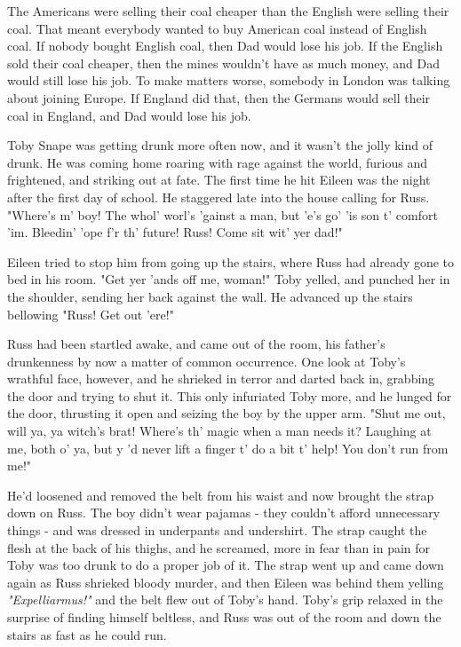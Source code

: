 \documentclass[a4paper,11pt]{article}
\begin{document}
The Americans were selling their coal cheaper than the English were selling their coal. That meant everybody wanted to buy American coal instead of English coal. If nobody bought English coal, then Dad would lose his job. If the English sold their coal cheaper, then the mines wouldn't have as much money, and Dad would still lose his job. To make matters worse, somebody in London was talking about joining Europe. If England did that, then the Germans would sell their coal in England, and Dad would lose his job.

Toby Snape was getting drunk more often now, and it wasn't the jolly kind of drunk. He was coming home roaring with rage against the world, furious and frightened, and striking out at fate. The first time he hit Eileen was the night after the first day of school. He staggered late into the house calling for Russ. "Where's m' boy! The whol' worl's 'gainst a man, but 'e's go' 'is son t' comfort 'im. Bleedin' 'ope f'r th' future! Russ! Come sit wit' yer dad!"

Eileen tried to stop him from going up the stairs, where Russ had already gone to bed in his room. "Get yer 'ands off me, woman!" Toby yelled, and punched her in the shoulder, sending her back against the wall. He advanced up the stairs bellowing "Russ! Get out 'ere!"

Russ had been startled awake, and came out of the room, his father's drunkenness by now a matter of common occurrence. One look at Toby's wrathful face, however, and he shrieked in terror and darted back in, grabbing the door and trying to shut it. This only infuriated Toby more, and he lunged for the door, thrusting it open and seizing the boy by the upper arm. "Shut me out, will ya, ya witch's brat! Where's th' magic when a man needs it? Laughing at me, both o' ya, but y 'd never lift a finger t' do a bit t' help! You don't run from me!"

He'd loosened and removed the belt from his waist and now brought the strap down on Russ. The boy didn't wear pajamas - they couldn't afford unnecessary things - and was dressed in underpants and undershirt. The strap caught the flesh at the back of his thighs, and he screamed, more in fear than in pain for Toby was too drunk to do a proper job of it. The strap went up and came down again as Russ shrieked bloody murder, and then Eileen was behind them yelling \emph{"Expelliarmus!"} and the belt flew out of Toby's hand. Toby's grip relaxed in the surprise of finding himself beltless, and Russ was out of the room and down the stairs as fast as he could run.
\end{document}
